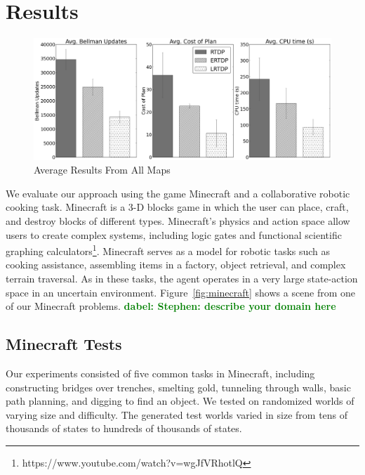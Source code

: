 \documentclass[letterpaper]{article}
\newcommand{\dnote}[1]{\textcolor{Green}{\textbf{dabel:  #1}}}
\begin{document}
\section{Results}
\label{sec:results}

\begin{figure}
\centering
\includegraphics[scale=0.18]{figures/average_results_cropped.png}%
\caption{Average Results From All Maps}
\label{fig:average_results}
\end{figure}

We evaluate our approach using the game Minecraft and a
collaborative robotic cooking task.  Minecraft is a 3-D blocks game in which
the user can place, craft, and destroy blocks of different types.
Minecraft's physics and action space allow users to create complex
systems, including logic gates and functional scientific graphing
calculators\footnote{https://www.youtube.com/watch?v=wgJfVRhotlQ}.
Minecraft serves as a model for robotic tasks such as cooking
assistance, assembling items in a factory, object retrieval, and
complex terrain traversal.  As in these tasks, the agent operates in a
very large state-action space in an uncertain environment.
Figure~\ref{fig:minecraft} shows a scene from one of our Minecraft
problems. \dnote{Stephen: describe your domain here}

\subsection{Minecraft Tests}

Our experiments consisted of five common tasks in Minecraft, including
constructing bridges over trenches, smelting gold, tunneling
through walls, basic path planning, and digging to find an object.  We tested on 
randomized worlds of varying size and difficulty. The generated test
worlds varied in size from tens of thousands of states to hundreds of thousands of states.
\end{document}
